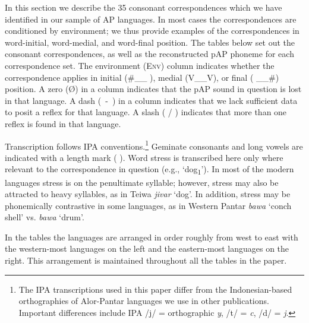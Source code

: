 In this section we describe the 35 consonant correspondences which we have identified in our sample of AP languages. In most cases the correspondences are conditioned by environment; we thus provide examples of the correspondences in word-initial, word-medial, and word-final position. The tables below set out the consonant correspondences, as well as the reconstructed pAP phoneme for each correspondence set. The environment (\textsc{Env}) column indicates whether the correspondence applies in initial (\#\_\_ ), medial (V\_\_V), or final ( \_\_\#) position. A zero ({\O}) in a column indicates that the pAP sound in question is lost in that language. A dash (~-~) in a column indicates that we lack sufficient data to posit a reflex for that language. A slash ( / ) indicates that more than one reflex is found in that language. 

Transcription follows IPA conventions.\footnote{ The IPA transcriptions used in this paper differ from the Indonesian-based orthographies of Alor-Pantar languages we use in other publications. Important differences include IPA /j/ = orthographic \textit{y}, /t{\textesh}/ = \textit{c}, /d{\textyogh}/ = \textit{j}.} Geminate consonants and long vowels are indicated with a length mark ( {\textlengthmark} ). Word stress is transcribed here only where relevant to the correspondence in question (e.g., `dog\textsubscript{1}'). In most of the modern languages stress is on the penultimate syllable; however, stress may also be attracted to heavy syllables, as in Teiwa \textit{ji{\textprimstress}var} `dog'. In addition, stress may be phonemically contrastive in some languages, as in Western Pantar \textit{ba}\textit{{\textprimstress}}\textit{wa} `conch shell' vs. \textit{{\textprimstress}}\textit{bawa} `drum'.

In the tables the languages are arranged in order roughly from west to east with the western-most languages on the left and the eastern-most languages on the right. This arrangement is maintained throughout all the tables in the paper. 


